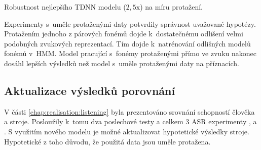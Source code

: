 \begin{table}[htpb]
  \centering
  \def\arraystretch{1.5}
  \caption{Robustnost nejlepšího TDNN modelu ($2,5\mathrm{x}$) na míru protažení.}
  \label{tab:realisation:augmentation:influence:tdnn:robust}
\end{table}

Experimenty s~uměle protaženými daty potvrdily správnost uvažované hypotézy.
Protažením jednoho z párových fonémů dojde  k~dostatečnému odlišení velmi podobných zvukových reprezentací.
Tím dojde  k~natrénování odlišných modelů fonémů v~HMM.
Model pracující s~fonémy protaženými přímo ve zvuku nakonec dosáhl lepších výsledků než model s~uměle protaženými daty na příznacích.

\subsection{Aktualizace výsledků porovnání}
\label{chap:realisation:augmentation:comparison}

V části \ref{chap:realisation:listening} byla prezentováno srovnání schopností člověka a stroje.
Posloužily k~tomu dva poslechové testy a celkem $3$ ASR experimenty ,  a .
S využitím nového modelu je možné aktualizovat hypotetické výsledky stroje.
Hypotetické z toho důvodu, že použitá data jsou uměle protažena.

